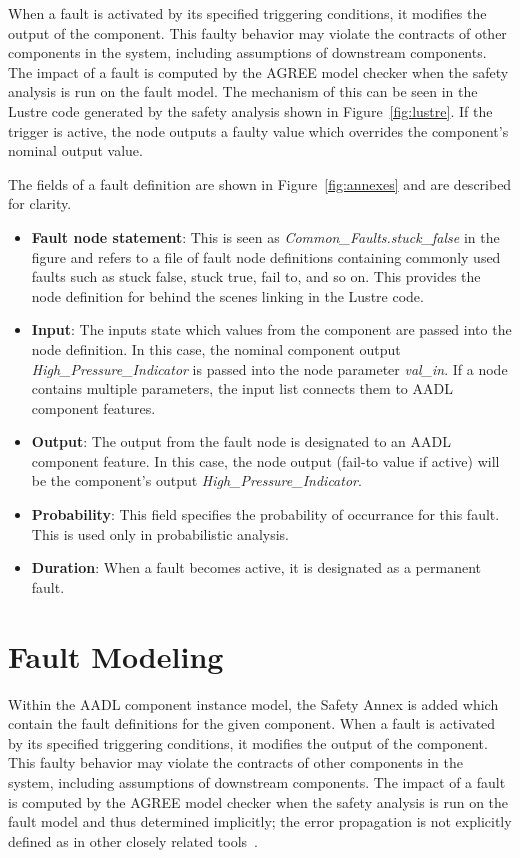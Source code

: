 When a fault is activated by its specified triggering conditions, it modifies the output of the component. This faulty behavior may violate the contracts of other components in the system, including assumptions of downstream components. The impact of a fault is computed by the AGREE model checker when the safety analysis is run on the fault model. The mechanism of this can be seen in the Lustre code generated by the safety analysis shown in Figure~\ref{fig:lustre}. If the trigger is active, the node outputs a faulty value which overrides the component's nominal output value.  

The fields of a fault definition are shown in Figure~\ref{fig:annexes} and are described for clarity.
\begin{itemize}
\item \textbf{Fault node statement}: This is seen as \textit{Common\_Faults.stuck\_false} in the figure and refers to a file of fault node definitions containing commonly used faults such as stuck false, stuck true, fail to, and so on. This provides the node definition for behind the scenes linking in the Lustre code.
\item \textbf{Input}: The inputs state which values from the component are passed into the node definition. In this case, the nominal component output \textit{High\_Pressure\_Indicator} is passed into the node parameter \textit{val\_in}. If a node contains multiple parameters, the input list connects them to AADL component features.
\item \textbf{Output}: The output from the fault node is designated to an AADL component feature. In this case, the node output (fail-to value if active) will be the component's output \textit{High\_Pressure\_Indicator}. 
\item \textbf{Probability}: This field specifies the probability of occurrance for this fault. This is used only in probabilistic analysis.
\item \textbf{Duration}: When a fault becomes active, it is designated as a permanent fault. 
\end{itemize}

\section{Fault Modeling}
Within the AADL component instance model, the Safety Annex is added which contain the fault definitions for the given component. When a fault is activated by its specified triggering conditions, it modifies the output of the component. This faulty behavior may violate the contracts of other components in the system, including assumptions of downstream components. The impact of a fault is computed by the AGREE model checker when the safety analysis is run on the fault model and thus determined implicitly; the error propagation is not explicitly defined as in other closely related tools~\cite{EMV2,compass30toolset}. 

